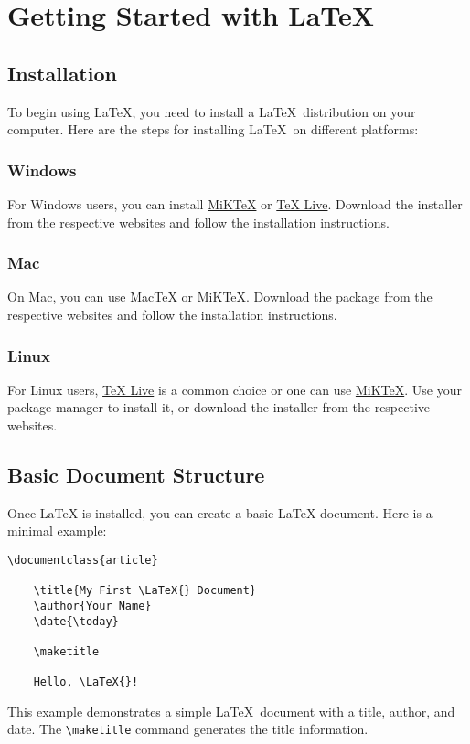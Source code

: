 \chapter{Getting Started with \LaTeX}
	\section{Installation}
		To begin using \LaTeX, you need to install a \LaTeX\ distribution on your computer. Here are the steps for installing \LaTeX\ on different platforms:

		\subsection{Windows}
			For Windows users, you can install \href{https://miktex.org/download}{MiKTeX} or \href{https://tug.org/texlive/windows.html}{TeX Live}. Download the installer from the respective websites and follow the installation instructions.

		\subsection{Mac}
			On Mac, you can use \href{https://tug.org/mactex/}{MacTeX} or \href{https://miktex.org/download}{MiKTeX}. Download the package from the respective websites and follow the installation instructions.

		\subsection{Linux}
			For Linux users, \href{https://tug.org/texlive/quickinstall.html}{TeX Live} is a common choice or one can use \href{https://miktex.org/download}{MiKTeX}. Use your package manager to install it, or download the installer from the respective websites.

	\section{Basic Document Structure}
		Once \LaTeX{} is installed, you can create a basic \LaTeX{} document. Here is a minimal example:

		\begin{lstlisting}[style=LaTeXStyle]
\documentclass{article}

    \title{My First \LaTeX{} Document}
    \author{Your Name}
    \date{\today}
    
    \maketitle
    
    Hello, \LaTeX{}!

		\end{lstlisting}
		This example demonstrates a simple \LaTeX\ document with a title, author, and date. 
		The \lstinline|\maketitle| command generates the title information.

